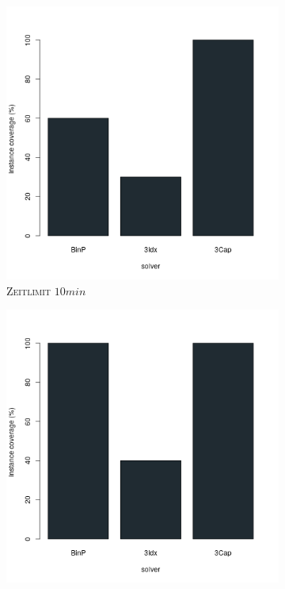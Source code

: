 \begin{figure}[H]
\centering

\begin{subfigure}[b]{0.3\textwidth}
\centering
\includegraphics[width=1.2\textwidth]{img/solver_instance_coverage_b=3_m_600s.png}
\caption{\textsc{Zeitlimit} $10min$}
\label{fig:instance_coverage_b=3_m_a}
\end{subfigure}
\hfill
\begin{subfigure}[b]{0.3\textwidth}
\centering
\includegraphics[width=1.2\textwidth]{img/solver_instance_coverage_b=3_m_1200s.png}

\end{subfigure}
\end{figure}
